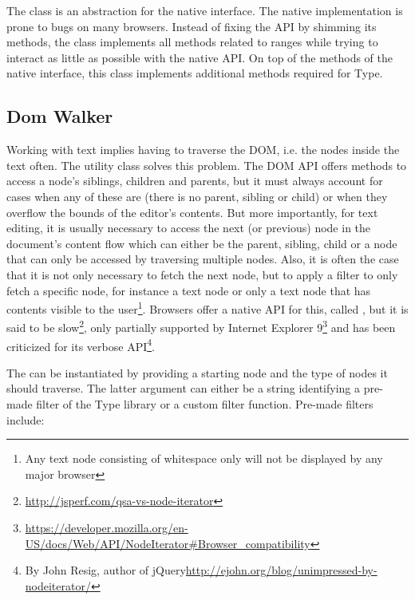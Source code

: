 The  class is an abstraction for the native  interface. The native implementation is prone to bugs on many browsers. Instead of fixing the API by shimming its methods, the  class implements all methods related to ranges while trying to interact as little as possible with the native API. On top of the methods of the native  interface, this class implements additional methods required for Type.








\subsection{Dom Walker}

Working with text implies having to traverse the DOM, i.e. the nodes inside the text often. The  utility class solves this problem. The DOM API offers methods to access a node's siblings, children and parents, but it must always account for cases when any of these are  (there is no parent, sibling or child) or when they overflow the bounds of the editor's contents. But more importantly, for text editing, it is usually necessary to access the next (or previous) node in the document's content flow which can either be the parent, sibling, child or a node that can only be accessed by traversing multiple nodes. Also, it is often the case that it is not only necessary to fetch the next node, but to apply a filter to only fetch a specific node, for instance a text node or only a text node that has contents visible to the user\footnote{Any text node consisting of whitespace only will not be displayed by any major browser}. Browsers offer a native API for this, called , but it is said to be slow\footnote{\url{http://jsperf.com/qsa-vs-node-iterator}}, only partially supported by Internet Explorer 9\footnote{\url{https://developer.mozilla.org/en-US/docs/Web/API/NodeIterator\#Browser_compatibility}} and has been criticized for its verbose API\footnote{By John Resig, author of jQuery\url{http://ejohn.org/blog/unimpressed-by-nodeiterator/}}.

The  can be instantiated by providing a starting node and the type of nodes it should traverse. The latter argument can either be a string identifying a pre-made filter of the Type library or a custom filter function. Pre-made filters include:


